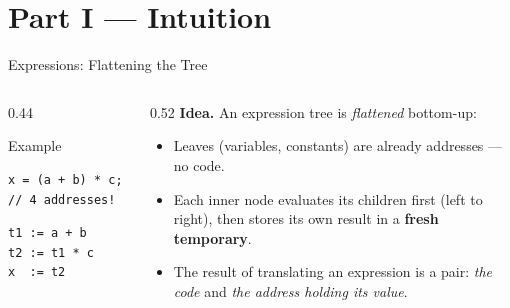\documentclass[aspectratio=169]{beamer}
\begin{document}
\section{Part I — Intuition}

\begin{frame}[fragile]{Expressions: Flattening the Tree}
  \begin{columns}[T]
    \begin{column}{0.44\textwidth}
      \begin{block}{Example}
        \begin{verbatim}
x = (a + b) * c; // 4 addresses!
        \end{verbatim}
        \vspace{0.3em} \pause
        \begin{verbatim}
t1 := a + b
t2 := t1 * c
x  := t2
        \end{verbatim}
      \end{block}
    \end{column} \pause
    \begin{column}{0.52\textwidth}
      \textbf{Idea.} An expression tree is \emph{flattened} bottom-up:
      \begin{itemize}
        \item Leaves (variables, constants) are already addresses — no code.
        \item Each inner node evaluates its children first (left to right),
              then stores its own result in a \textbf{fresh temporary}.
        \item The result of translating an expression is a pair:
              \emph{the code} and \emph{the address holding its value}.
      \end{itemize}
    \end{column}

  \end{columns}
\end{frame}
\end{document}
